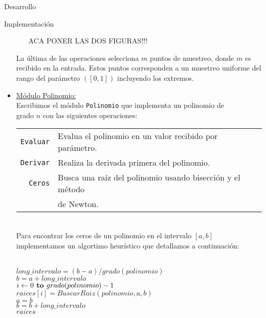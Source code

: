 \begin{section}{Desarrollo}
\begin{subsection}{Implementación}
\begin{itemize}
\begin{itemize}
						ACA PONER LAS DOS FIGURAS!!!
				\end{itemize}
				
				La última de las operaciones selecciona $m$ puntos de muestreo, donde $m$ es recibido en la entrada.
				Estos puntos corresponden a un muestreo uniforme del rango del parámetro $([0,1])$ incluyendo los extremos.\\
				
				\item \underline{Módulo Polinomio:}\\
				Escribimos el módulo \texttt{Polinomio} que implementa un polinomio de\\
				grado $n$ con las siguientes operaciones:\\
				
				\begin{tabular}{rl}
					\texttt{Evaluar} & Evalua el polinomio en un valor recibido por parámetro.\\
					\texttt{Derivar} & Realiza la derivada primera del polinomio.\\
					\texttt{Ceros}   & Busca una raíz del polinomio usando bisección y el método\\
									 & de Newton.\\
				\end{tabular}\\ 
				
				Para encontrar los ceros de un polinomio en el intervalo $[a,b]$ implementamos un algortimo heurístico que detallamos a continuación:\\
				
				\begin{pseudo}
					\\
					\tab $long\_intervalo = (b-a)/grado(polinomio)$\\
					\tab $b = a+long\_intervalo$\\
					\tab \FOR $i\gets 0 \textbf{ to } grado(polinomio)-1$\\
					\tab\tab\tab $raices[i] = BuscarRaiz(polinomio,a,b)$\\
					\tab\tab\tab $a = b$\\
					\tab\tab\tab $b = b + long\_intervalo$\\
					\tab \RET $raices$\\
				\end{pseudo}
		

\end{itemize}
\end{subsection}
\end{section}
